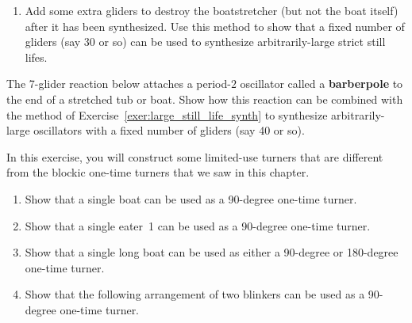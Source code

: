 \begin{multicols}{2}
\begin{problemstar}
\begin{enumerate}[label=\bf\color{ocre}(\alph*)]
			\item {} Add some extra gliders to destroy the boatstretcher (but not the boat itself) after it has been synthesized. Use this method to show that a fixed number of gliders (say 30 or so) can be used to synthesize arbitrarily-large strict still lifes.
		\end{enumerate}
	\end{problemstar}
	
	
	\mfilbreak
	
	
	\begin{problem}\label{exer:large_oscillator_synth} 
		The 7-glider reaction below attaches a period-$2$ oscillator called a \textbf{barberpole} to the end of a stretched tub or boat. Show how this reaction can be combined with the method of Exercise~\ref{exer:large_still_life_synth} to synthesize arbitrarily-large oscillators with a fixed number of gliders (say 40 or so).
		
		\begin{center}
		\end{center}
	\end{problem}
	
	
	\mfilbreak
	
	
	\begin{problemstar}\label{exer:boat_one_time_turner} 
		In this exercise, you will construct some limited-use turners that are different from the blockic one-time turners that we saw in this chapter.\smallskip
		
		\begin{enumerate}[label=\bf\color{ocre}(\alph*)]
			\item Show that a single boat can be used as a 90-degree one-time turner.
			
			\item Show that a single eater~1 can be used as a 90-degree one-time turner.
			
			\item Show that a single long boat can be used as either a 90-degree or 180-degree one-time turner.
			
			\item Show that the following arrangement of two blinkers can be used as a 90-degree one-time turner.
			\begin{center}
			\end{center}
		\end{enumerate}
	\end{problemstar}
	

\end{multicols}
